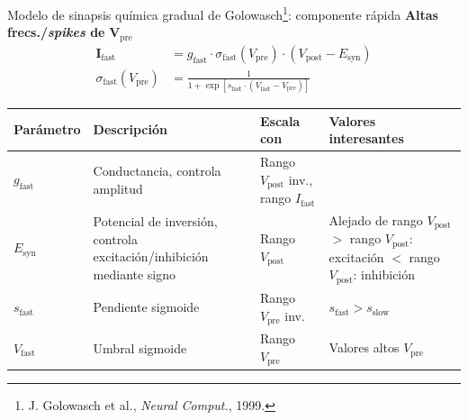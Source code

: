 \documentclass[10pt, aspectratio=169]{beamer}
\begin{document}
\begin{frame}{Modelo de sinapsis química gradual de Golowasch\footnote{J. Golowasch et al., \textit{Neural Comput.}, 1999.}: componente rápida}
    \textbf{Altas frecs./\textit{spikes} de} $\boldsymbol{V_{\mathrm{pre}}}$ \\[0.8em]
    \scriptsize
    \begin{equation*}
        \boxed{\begin{aligned}
                \boldsymbol{I_{\mathrm{fast}}}           & = g_{\mathrm{fast}} \cdot \sigma_{\mathrm{fast}}(V_{\mathrm{pre}}) \cdot (V_{\mathrm{post}} - E_{\mathrm{syn}}) \\
                \sigma_{\mathrm{fast}}(V_{\mathrm{pre}}) & = \frac{1}{1 + \exp[ s_{\mathrm{fast}} \cdot (V_{\mathrm{fast}} - V_{\mathrm{pre}}) ]}
            \end{aligned}}
    \end{equation*}

    \begin{center}
        \setlength{\tabcolsep}{2pt}
        \begin{tabular}{|l|>{\raggedright\arraybackslash}m{3.4cm}|>{\raggedright\arraybackslash}m{2.6cm}|l|}
            \hline
            \textbf{Parámetro}  & \textbf{Descripción}                                                  & \textbf{Escala con}                                       & \textbf{Valores interesantes}                     \\
            \hline
            \rowcolor{azulclaro}
            $g_{\mathrm{fast}}$ & Conductancia, controla amplitud                                       & Rango $V_{\mathrm{post}}$ inv., rango $I_{\mathrm{fast}}$ &                                                   \\
            \hline
            $E_{\mathrm{syn}}$  & Potencial de inversión, controla excitación/inhibición mediante signo & Rango $V_{\mathrm{post}}$                                 & \makecell[l]{Alejado de rango $V_{\mathrm{post}}$ \\\\$>$ rango $V_{\mathrm{post}}$: excitación\\$<$ rango $V_{\mathrm{post}}$: inhibición} \\
            \hline
            \rowcolor{azulclaro}
            $s_{\mathrm{fast}}$ & Pendiente sigmoide                                                    & Rango $V_{\mathrm{pre}}$ inv.                             & $s_{\mathrm{fast}} > s_{\mathrm{slow}}$           \\
            \hline
            $V_{\mathrm{fast}}$ & Umbral sigmoide                                                       & Rango $V_{\mathrm{pre}}$                                  & Valores altos $V_{\mathrm{pre}}$                  \\
            \hline
        \end{tabular}
    \end{center}
\end{frame}
\end{document}
